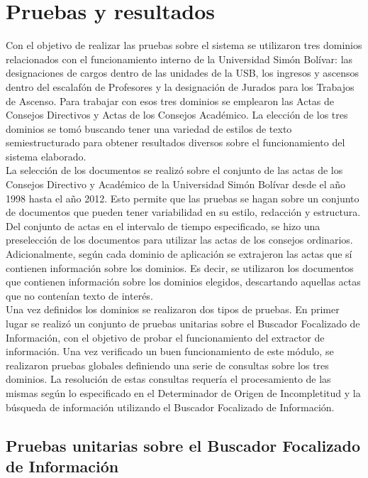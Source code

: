 \chapter{Pruebas y resultados} \label{chap:pruebas}

Con el objetivo de realizar las pruebas sobre el sistema se utilizaron tres dominios relacionados con el funcionamiento interno de la Universidad Simón Bolívar: las designaciones de cargos dentro de las unidades de la USB, los ingresos y ascensos dentro del escalafón de Profesores y la designación de Jurados para los Trabajos de Ascenso. Para trabajar con esos tres dominios se emplearon las Actas de Consejos Directivos y Actas de los Consejos Académico. La elección de los tres dominios se tomó buscando tener una variedad de estilos de texto semiestructurado para obtener resultados diversos sobre el funcionamiento del sistema elaborado. \\

La selección de los documentos se realizó sobre el conjunto de las actas de los Consejos Directivo y Académico de la Universidad Simón Bolívar desde el año 1998 hasta el año 2012. Esto permite que las pruebas se hagan sobre un conjunto de documentos que pueden tener variabilidad en su estilo, redacción y estructura. Del conjunto de actas en el intervalo de tiempo especificado, se hizo una preselección de los documentos para utilizar las actas de los consejos ordinarios. Adicionalmente, según cada dominio de aplicación se extrajeron las actas que sí contienen información sobre los dominios. Es decir, se utilizaron los documentos que contienen información sobre los dominios elegidos, descartando aquellas actas que no contenían texto de interés.\\

Una vez definidos los dominios se realizaron dos tipos de pruebas. En primer lugar se realizó un conjunto de pruebas unitarias sobre el Buscador Focalizado de Información, con el objetivo de probar el funcionamiento del extractor de información. Una vez verificado un buen funcionamiento de este módulo, se realizaron pruebas globales definiendo una serie de consultas sobre los tres dominios. La resolución de estas consultas requería el procesamiento de las mismas según lo especificado en el Determinador de Origen de Incompletitud y la búsqueda de información utilizando el Buscador Focalizado de Información.  \\


\section{Pruebas unitarias sobre el Buscador Focalizado de Información}

